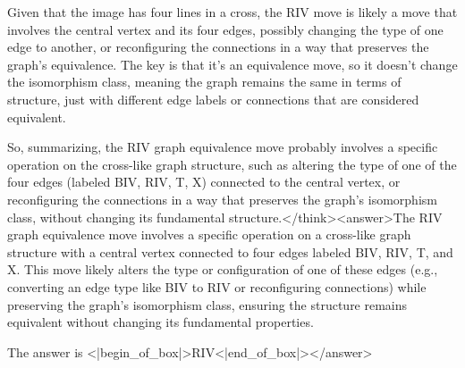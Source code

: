 Given that the image has four lines in a cross, the RIV move is likely a move that involves the central vertex and its four edges, possibly changing the type of one edge to another, or reconfiguring the connections in a way that preserves the graph's equivalence. The key is that it's an equivalence move, so it doesn't change the isomorphism class, meaning the graph remains the same in terms of structure, just with different edge labels or connections that are considered equivalent. 

So, summarizing, the RIV graph equivalence move probably involves a specific operation on the cross-like graph structure, such as altering the type of one of the four edges (labeled BIV, RIV, T, X) connected to the central vertex, or reconfiguring the connections in a way that preserves the graph's isomorphism class, without changing its fundamental structure.</think><answer>The RIV graph equivalence move involves a specific operation on a cross-like graph structure with a central vertex connected to four edges labeled BIV, RIV, T, and X. This move likely alters the type or configuration of one of these edges (e.g., converting an edge type like BIV to RIV or reconfiguring connections) while preserving the graph's isomorphism class, ensuring the structure remains equivalent without changing its fundamental properties.  

The answer is <|begin_of_box|>RIV<|end_of_box|></answer>